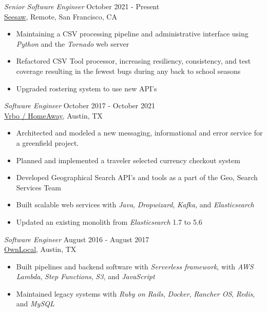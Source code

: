 \documentclass[margin, 10pt]{res} %
\begin{document}
\begin{resume}
{\sl Senior Software Engineer} \hfill October 2021 - Present \\
\href{https://web.seesaw.me/}{Seesaw}, Remote, San Francisco, CA
\begin{itemize}
    \item Maintaining a CSV processing pipeline and administrative interface using {\it Python} and the {\it Tornado} web server
    \item Refactored CSV Tool processor, increasing resiliency, consistency, and test coverage resulting in the fewest bugs during any back to school seasons
    \item Upgraded rostering system to use new API's
\end{itemize}

{\sl Software Engineer} \hfill October 2017 - October 2021 \\
\href{https://www.vrbo.com/}{Vrbo / HomeAway}, Austin, TX
\begin{itemize}
    \item Architected and modeled a new messaging, informational and error service for a greenfield project. 
    \item Planned and implemented a traveler selected currency checkout system
    \item Developed Geographical Search API's and tools as a part of the Geo, Search Services Team
    \item Built scalable web services with {\it Java}, {\it Dropwizard}, {\it Kafka}, and {\it Elasticsearch}
    \item Updated an existing monolith from {\it Elasticsearch} 1.7 to 5.6
\end{itemize}


{\sl Software Engineer } \hfill August 2016 - August 2017 \\
\href{https://www.ownlocal.com}{OwnLocal}, Austin, TX
\begin{itemize}
    \item Built pipelines and backend software with {\it Serverless framework}, with {\it AWS Lambda}, {\it Step Functions}, {\it S3}, and {\it JavaScript}
    \item Maintained legacy systems with {\it Ruby on Rails}, {\it Docker}, {\it Rancher OS}, {\it Redis}, and {\it MySQL}
\end{itemize}


\end{resume}
\end{document}

